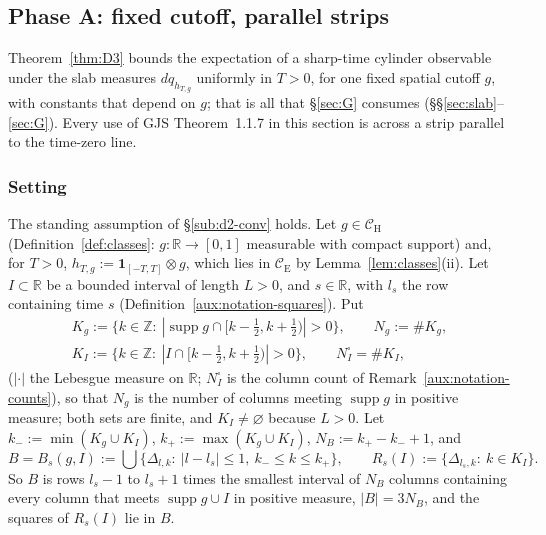 \documentclass[11pt,a4paper]{article}
\theoremstyle{plain}
\theoremstyle{definition}
\theoremstyle{plain}
\theoremstyle{definition}
\newcommand{\R}{\mathbb{R}}
\newcommand{\Z}{\mathbb{Z}}
\newcommand{\CE}{\mathcal{C}_{\mathrm E}}
\newcommand{\CH}{\mathcal{C}_{\mathrm H}}
\DeclareMathOperator{\supp}{supp}
\begin{document}
\subsection{Phase A: fixed cutoff, parallel strips}\label{sec:d3}

Theorem~\ref{thm:D3} bounds the expectation of a sharp-time cylinder observable under the slab
measures $dq_{h_{T,g}}$ uniformly in $T>0$, for one fixed spatial cutoff $g$, with constants that
depend on $g$; that is all that \S\ref{sec:G} consumes (\S\S\ref{sec:slab}--\ref{sec:G}).  Every use of GJS
Theorem~1.1.7 in this section is across a strip parallel to the time-zero line.

\subsubsection{Setting}\label{sub:d3-setting}

The standing assumption of \S\ref{sub:d2-conv} holds.  Let $g\in\CH$ (Definition~\ref{def:classes}: $g:\R\to[0,1]$ measurable with compact support) and, for $T>0$,
$h_{T,g}:=\mathbf 1_{[-T,T]}\otimes g$, which lies in $\CE$ by Lemma~\ref{lem:classes}(ii).  Let $I\subset\R$ be a bounded interval of length $L>0$, and $s\in\R$, with
$l_s$ the row containing time $s$ (Definition~\ref{aux:notation-squares}).  Put
\begin{gather*}
 K_g:=\bigl\{k\in\Z:\ |\supp g\cap[k-\tfrac12,k+\tfrac12)|>0\bigr\},\qquad N_g:=\#K_g ,\\
 K_I:=\bigl\{k\in\Z:\ |I\cap[k-\tfrac12,k+\tfrac12)|>0\bigr\},\qquad N^{\square}_I=\#K_I ,
\end{gather*}
($|\cdot|$ the Lebesgue measure on $\R$; $N^\square_I$ is the column count of
Remark~\ref{aux:notation-counts}), so that $N_g$ is the number of columns meeting $\supp g$ in
positive measure; both sets are finite, and $K_I\ne\varnothing$ because $L>0$.  Let
$k_-:=\min(K_g\cup K_I)$, $k_+:=\max(K_g\cup K_I)$, $N_B:=k_+-k_-+1$, and
\[
 B=B_s(g,I):=\bigcup\{\Delta_{l,k}:\ |l-l_s|\le1,\ k_-\le k\le k_+\},\qquad
 R_s(I):=\{\Delta_{l_s,k}:\ k\in K_I\} .
\]
So $B$ is rows $l_s-1$ to $l_s+1$ times the smallest interval of $N_B$ columns containing every
column that meets $\supp g\cup I$ in positive measure, $|B|=3N_B$, and the squares of $R_s(I)$
lie in $B$.
\end{document}
